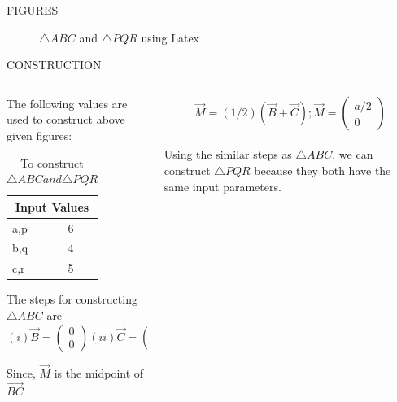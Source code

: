 \documentclass[11pt]{beamer}
\begin{document}
\begin{frame}{FIGURES}
\begin{figure}
\resizebox{10cm}{!}{}
\caption{$\triangle ABC$ and $\triangle PQR$ using Latex}
\end{figure}
\end{frame}

\begin{frame}{CONSTRUCTION}
\begin{columns}
\begin{column}{0.5\textwidth}
The following values are used to construct above given figures:
\begin{table}[htbp]
\centering
\resizebox{0.5\textwidth}{!}
{\begin{minipage}{\textwidth}
\begin{tabular}{ |p{3cm}|p{3cm}|  }
\hline
 \multicolumn{2}{|c|}{Input Values} \\
\hline
a,p & 6\\
\hline
b,q & 4\\
\hline
c,r & 5 \\
\hline
\end{tabular}
\end{minipage}}
\caption{\tiny To construct $\triangle ABC and \triangle PQR $}
\end{table}



The steps for constructing $\triangle ABC$ are
\newline
$$(i)\vec{B}= \begin{pmatrix}0\\0\end{pmatrix}
(ii)\vec{C}=\begin{pmatrix}a\\0\end{pmatrix}$$

Since, $\vec{M}$ is the midpoint of $\vec{BC}$
\end{column}
\begin{column}{0.5\textwidth}
$$\vec{M}=(1/2)(\vec{B}+\vec{C});
\vec{M}=\begin{pmatrix}a/2\\0\end{pmatrix}$$ \\
Using the similar steps as $\triangle ABC$, we can construct $\triangle PQR$ because they both have the same input parameters.



\end{column}
\end{columns}
\end{frame}
\end{document}
